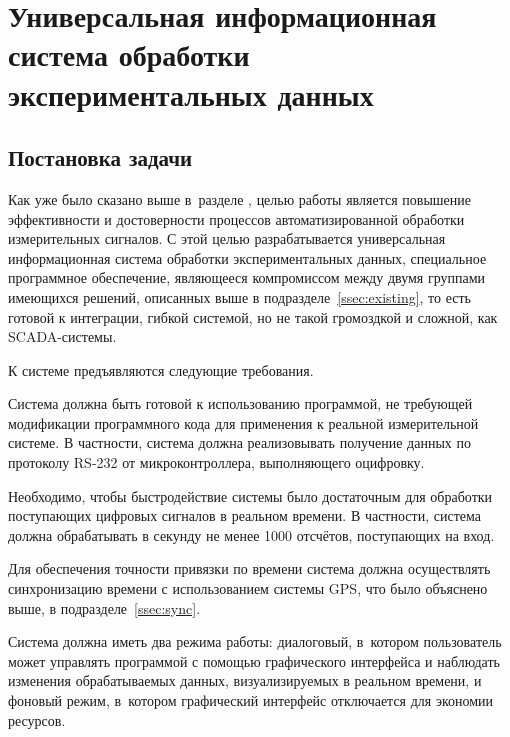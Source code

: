 \documentclass[a4paper, 14pt, titlepage]{extarticle}
\let\oldsection\section
\renewcommand{\section}{\newpage\oldsection}
\begin{document}
  \section{Универсальная информационная система обработки экспериментальных данных}

  \subsection{Постановка задачи}\label{ssec:task}

  Как уже было сказано выше в~разделе ,
  целью работы является повышение эффективности и достоверности процессов автоматизированной
  обработки измерительных сигналов. С этой целью разрабатывается универсальная информационная
  система обработки экспериментальных данных,
  специальное программное обеспечение,
  являющееся компромиссом между двумя группами имеющихся решений, описанных выше в
  подразделе~\ref{ssec:existing}, то есть готовой к интеграции, гибкой системой, но не такой
  громоздкой и сложной, как SCADA-системы.

  К системе предъявляются следующие требования.

  Система должна быть готовой к использованию программой, не требующей модификации программного кода
  для применения к реальной измерительной системе. В частности, система должна реализовывать
  получение данных по протоколу RS-232\cite{sweet-serial} от микроконтроллера, выполняющего оцифровку.

  Необходимо, чтобы быстродействие системы было достаточным для обработки поступающих цифровых
  сигналов в реальном времени. В частности, система должна обрабатывать в секунду не менее 1000 %
  отсчётов, поступающих на вход.

  Для обеспечения точности привязки по времени система должна осуществлять синхронизацию времени с
  использованием системы GPS, что было объяснено выше, в подразделе~\ref{ssec:sync}.

  Система должна иметь два режима работы: диалоговый, в~котором пользователь может управлять
  программой с помощью графического интерфейса и наблюдать изменения обрабатываемых данных,
  визуализируемых в реальном времени, и фоновый режим, в~котором графический интерфейс отключается
  для экономии ресурсов.
\end{document}
